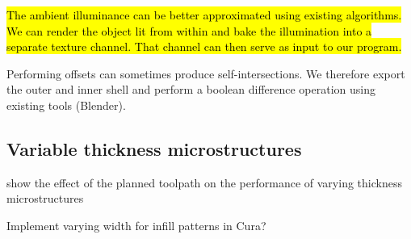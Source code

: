 \hl{The ambient illuminance can be better approximated using existing algorithms.
We can render the object lit from within and bake the illumination into a separate texture channel.
That channel can then serve as input to our program.}


Performing offsets can sometimes produce self-intersections.
We therefore export the outer and inner shell and perform a boolean difference operation using existing tools (Blender).



\subsection{Variable thickness microstructures}
show the effect of the planned toolpath on the performance of varying thickness microstructures

Implement varying width for infill patterns in Cura?
